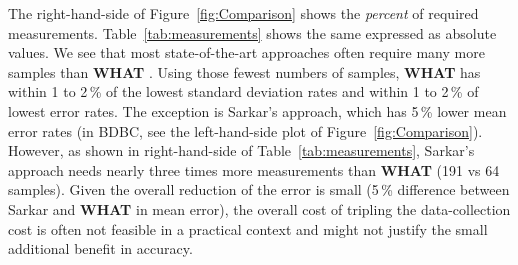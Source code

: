 \documentclass{newsig}
\newcommand{\bi}{\begin{itemize}}%
\newcommand{\ei}{\end{itemize}}
\newcommand{\fig}[1]{Figure~\ref{fig:#1}}
\newcommand{\what}{{\bf WHAT }}
\begin{document}

 

The right-hand-side of Figure~\ref{fig:Comparison}   shows
the {\em percent} of required measurements. Table~\ref{tab:measurements} shows the same
expressed as absolute values. We see that most state-of-the-art approaches often require many more samples than
\what{}.  Using those fewest numbers of samples, \what has
within 1 to 2\,\% of the lowest standard deviation rates 
and within 1 to 2\,\% of lowest error rates.
The exception is Sarkar's approach, which has 5\,\% lower mean error
rates (in BDBC, see the left-hand-side plot of Figure~\ref{fig:Comparison}).  However, 
as shown in right-hand-side of Table~\ref{tab:measurements}, Sarkar's approach needs nearly three times
more measurements than \what (191 vs 64 samples). Given
the overall reduction of the error is   small (5\,\% difference
between Sarkar and \what in mean error), the overall
cost of tripling the data-collection cost is
often not feasible in a practical context and might not justify the small additional benefit in accuracy. 


    






% 

% 

% 

% 

\end{document}
